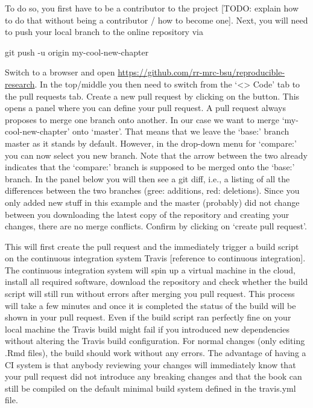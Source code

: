 \documentclass[]{book}
\newenvironment{Shaded}{\begin{snugshade}}{\end{snugshade}}
\newcommand{\FunctionTok}[1]{\textcolor[rgb]{0.00,0.00,0.00}{#1}}
\newcommand{\NormalTok}[1]{#1}
\begin{document}
To do so, you first have to be a contributor to the project {[}TODO:
explain how to do that without being a contributor / how to become
one{]}. Next, you will need to push your local branch to the online
repository via

\begin{Shaded}
\begin{Highlighting}[]
\FunctionTok{git}\NormalTok{ push -u origin my-cool-new-chapter}
\end{Highlighting}
\end{Shaded}

Switch to a browser and open
\url{https://github.com/rr-mrc-bsu/reproducible-research}. In the
top/middle you then need to switch from the `\textless{}\textgreater{}
Code' tab to the pull requests tab. Create a new pull request by
clicking on the button. This opens a panel where you can define your
pull request. A pull request always proposes to merge one branch onto
another. In our case we want to merge `my-cool-new-chapter' onto
`master'. That means that we leave the `base:' branch master as it
stands by default. However, in the drop-down menu for `compare:' you can
now select you new branch. Note that the arrow between the two already
indicates that the `compare:' branch is supposed to be merged onto the
`base:' branch. In the panel below you will then see a git diff, i.e., a
listing of all the differences between the two branches (gree:
additions, red: deletions). Since you only added new stuff in this
example and the master (probably) did not change between you downloading
the latest copy of the repository and creating your changes, there are
no merge conflicts. Confirm by clicking on `create pull request'.

This will first create the pull request and the immediately trigger a
build script on the continuous integration system Travis {[}reference to
continuous integration{]}. The continuous integration system will spin
up a virtual machine in the cloud, install all required software,
download the repository and check whether the build script will still
run without errors after merging you pull request. This process will
take a few minutes and once it is completed the status of the build will
be shown in your pull request. Even if the build script ran perfectly
fine on your local machine the Travis build might fail if you introduced
new dependencies without altering the Travis build configuration. For
normal changes (only editing .Rmd files), the build should work without
any errors. The advantage of having a CI system is that anybody
reviewing your changes will immediately know that your pull request did
not introduce any breaking changes and that the book can still be
compiled on the default minimal build system defined in the travis.yml
file.
\end{document}
